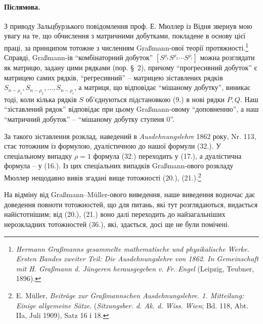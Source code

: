 \documentclass[11pt]{article}
\begin{document}
\paragraph{Післямова.} З приводу Зальцбурзького повідомлення проф. Е. Мюллер із Відня звернув мою увагу на те, що обчислення з матричними добутками, покладене в основу цієї праці, за принципом тотожне з численням Graßmann-ової теорії протяжності.\footnote{\emph{Hermann Graßmanns gesammelte mathematische und physikalische Werke. Ersten Bandes zweiter Teil: Die Ausdehnungslehre von 1862. In Gemeinschaft mit H. Graßmann d. Jüngeren herausgegeben v. Fr. Engel} (Leipzig, Teubner, 1896).} Справді, Graßmann-ів ``комбінаторний добуток'' $[S^{\rho_1}S^{\rho_2}\cdots S^{\rho_i}]$ можна розглядати як матрицю, задану цими рядками (пор. \S\ 2), причому ``прогресивний добуток'' є матрицею самих рядків, ``регресивний'' -- матрицею зіставлених рядків $S_{n-\rho_1},S_{n-\rho_2},\ldots,S_{n-\rho_i}$, а матриця, що відповідає ``мішаному добутку'', виникає тоді, коли кілька рядків $S$ об'єднуються підстановкою (9.) в нові рядки $P,Q$. Наш ``зіставлений рядок'' відповідає при цьому Graßmann-овому ``доповненню'', а наш ``матричний добуток'' -- ``мішаному добутку ступеня 0''.

За такого зіставлення розклад, наведений в \emph{Ausdehnungslehre} 1862 року, Nr. 113, стає тотожним із формулою, дуалістичною до нашої формули (32.). У спеціальному випадку $\rho=1$ формула (32.) переходить у (17.), а дуалістична формула -- у (16.). Із цих спеціальних випадків Graßmann-ового розкладу Мюллер нещодавно вивів згадані вище тотожності (20.), (21.).\footnote{E. Müller, \emph{Beiträge zur Graßmannschen Ausdehnungslehre. 1. Mitteilung: Einige allgemeine Sätze}. (\emph{Sitzungsber. d. Ak. d. Wiss. Wien}; Bd. 118, Abt. IIa, Juli 1909), Satz 16 і 18.}

На відміну від Graßmann--Müller-ового виведення, наше виведення водночас дає доведення повноти тотожностей, що для питань, які тут розглядаються, видається найістотнішим; від (20.), (21.) воно далі переходить до найзагальніших нерозкладних тотожностей (36.), які, здається, досі ще не були помічені.
\end{document}
